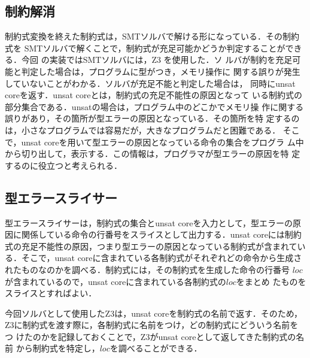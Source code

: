 \subsection{制約解消}
制約式変換を終えた制約式は，SMTソルバで解ける形になっている．その制約式を
SMTソルバで解くことで，制約式が充足可能かどうか判定することができる．今回
の実装ではSMTソルバには，Z3 \cite{DBLP:conf/tacas/MouraB08}を使用した．ソ
ルバが制約を充足可能と判定した場合は，プログラムに型がつき，メモリ操作に
関する誤りが発生していないことがわかる．ソルバが充足不能と判定した場合は，
同時にunsat coreを返す．unsat coreとは，制約式の充足不能性の原因となって
いる制約式の部分集合である．unsatの場合は，プログラム中のどこかでメモリ操
作に関する誤りがあり，その箇所が型エラーの原因となっている．その箇所を特
定するのは，小さなプログラムでは容易だが，大きなプログラムだと困難である．
そこで，unsat coreを用いて型エラーの原因となっている命令の集合をプログラ
ム中から切り出して，表示する．この情報は，プログラマが型エラーの原因を特
定するのに役立つと考えられる．

\subsection{型エラースライサー}
型エラースライサーは，制約式の集合とunsat coreを入力として，型エラーの原
因に関係している命令の行番号をスライスとして出力する．unsat coreには制約
式の充足不能性の原因，つまり型エラーの原因となっている制約式が含まれてい
る．そこで，unsat coreに含まれている各制約式がそれぞれどの命令から生成さ
れたものなのかを調べる．制約式には，その制約式を生成した命令の行番号
$loc$が含まれているので，unsat coreに含まれている各制約式の$loc$をまとめ
たものをスライスとすればよい．

今回ソルバとして使用したZ3は，unsat coreを制約式の名前で返す．そのため，
Z3に制約式を渡す際に，各制約式に名前をつけ，どの制約式にどういう名前をつ
けたのかを記録しておくことで，Z3がunsat coreとして返してきた制約式の名前
から制約式を特定し，$loc$を調べることができる．

